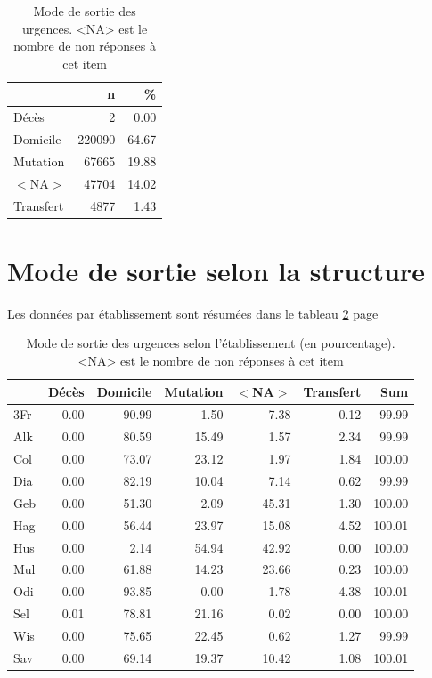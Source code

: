 \documentclass[12pt,english,french,twoside]{book}\usepackage[]{graphicx}\usepackage[]{color}
\begin{document}
\begin{table}[ht]
\centering
\begin{tabular}{|l|r|r|}
  \hline
 & n & \% \\ 
  \hline
Décès & 2 & 0.00 \\ 
  Domicile & 220090 & 64.67 \\ 
  Mutation & 67665 & 19.88 \\ 
  $<$NA$>$ & 47704 & 14.02 \\ 
  Transfert & 4877 & 1.43 \\ 
   \hline
\end{tabular}
\caption[Mode de sortie des urgences]{Mode de sortie des urgences. <NA> est le nombre de non réponses à cet item} 
\label{tab.sortie}
\end{table}



\section{Mode de sortie selon la structure}

Les données par établissement sont résumées dans le tableau \ref{tab.sortie_etab} page \pageref{tab.sortie_etab}

\begin{table}[ht]
\centering
\begin{tabular}{|l|r|r|r|r|r|r|}
  \hline
 & Décès & Domicile & Mutation & $<$NA$>$ & Transfert & Sum \\ 
  \hline
3Fr & 0.00 & 90.99 & 1.50 & 7.38 & 0.12 & 99.99 \\ 
  Alk & 0.00 & 80.59 & 15.49 & 1.57 & 2.34 & 99.99 \\ 
  Col & 0.00 & 73.07 & 23.12 & 1.97 & 1.84 & 100.00 \\ 
  Dia & 0.00 & 82.19 & 10.04 & 7.14 & 0.62 & 99.99 \\ 
  Geb & 0.00 & 51.30 & 2.09 & 45.31 & 1.30 & 100.00 \\ 
  Hag & 0.00 & 56.44 & 23.97 & 15.08 & 4.52 & 100.01 \\ 
  Hus & 0.00 & 2.14 & 54.94 & 42.92 & 0.00 & 100.00 \\ 
  Mul & 0.00 & 61.88 & 14.23 & 23.66 & 0.23 & 100.00 \\ 
  Odi & 0.00 & 93.85 & 0.00 & 1.78 & 4.38 & 100.01 \\ 
  Sel & 0.01 & 78.81 & 21.16 & 0.02 & 0.00 & 100.00 \\ 
  Wis & 0.00 & 75.65 & 22.45 & 0.62 & 1.27 & 99.99 \\ 
  Sav & 0.00 & 69.14 & 19.37 & 10.42 & 1.08 & 100.01 \\ 
   \hline
\end{tabular}
\caption[Mode de sortie selon l'établissement]{Mode de sortie des urgences selon l'établissement (en pourcentage). <NA> est le nombre de non réponses à cet item} 
\label{tab.sortie_etab}
\end{table}
\end{document}

